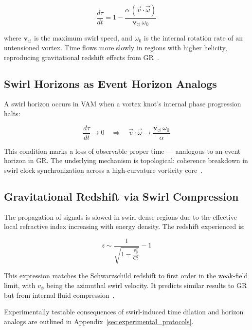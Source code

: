 \documentclass[preprint]{revtex4-2}
\begin{document}
    \begin{equation}
    \frac{d\tau}{dt} = 1 - \frac{\alpha \, (\vec{v} \cdot \vec{\omega})}{\mathbf{v}_{\scriptscriptstyle\boldsymbol{\circlearrowleft}} \, \omega_0}
    \label{eq:vam_time_dilation}
    \end{equation}

    where \( \mathbf{v}_{\scriptscriptstyle\boldsymbol{\circlearrowleft}} \) is the maximum swirl speed, and \( \omega_0 \) is the internal rotation rate of an untensioned vortex. Time flows more slowly in regions with higher helicity, reproducing gravitational redshift effects from GR~\cite{volovik2003universe}.

    \subsection{Swirl Horizons as Event Horizon Analogs}
    A swirl horizon occurs in VAM when a vortex knot’s internal phase progression halts:

    \[
        \frac{d\tau}{dt} \rightarrow 0 \quad \Rightarrow \quad \vec{v} \cdot \vec{\omega} \rightarrow \frac{\mathbf{v}_{\scriptscriptstyle\boldsymbol{\circlearrowleft}} \, \omega_0}{\alpha}
    \]

    This condition marks a loss of observable proper time — analogous to an event horizon in GR. The underlying mechanism is topological: coherence breakdown in swirl clock synchronization across a high-curvature vorticity core~\cite{ranada1992knots}.

    \subsection{Gravitational Redshift via Swirl Compression}
    The propagation of signals is slowed in swirl-dense regions due to the effective local refractive index increasing with energy density. The redshift experienced is:

    \begin{equation}
        z \sim \frac{1}{\sqrt{1 - \frac{v_\phi^2}{C_e^2}}} - 1
    \end{equation}

    This expression matches the Schwarzschild redshift to first order in the weak-field limit, with \( v_\phi \) being the azimuthal swirl velocity. It predicts similar results to GR but from internal fluid compression~\cite{volovik2003universe, kleckner2013creation}.

    Experimentally testable consequences of swirl-induced time dilation and horizon analogs are outlined in Appendix~\ref{sec:experimental_protocols}.
\end{document}
